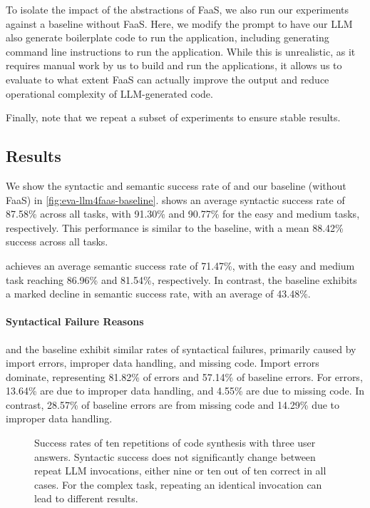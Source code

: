 To isolate the impact of the abstractions of FaaS, we also run our experiments against a baseline without FaaS.
Here, we modify the prompt to have our LLM also generate boilerplate code to run the application, including generating command line instructions to run the application.
While this is unrealistic, as it requires manual work by us to build and run the applications, it allows us to evaluate to what extent FaaS can actually improve the output and reduce operational complexity of LLM-generated code.

Finally, note that we repeat a subset of experiments to ensure stable results.


\subsection{Results}
\label{sec:eva:results}


We show the syntactic and semantic success rate of \sysname{} and our baseline (without FaaS) in \cref{fig:eva-llm4faas-baseline}.
\sysname{} shows an average syntactic success rate of 87.58\% across all tasks, with 91.30\% and 90.77\% for the easy and medium tasks, respectively.
This performance is similar to the baseline, with a mean 88.42\% success across all tasks.

\sysname{} achieves an average semantic success rate of 71.47\%, with the easy and medium task reaching 86.96\% and 81.54\%, respectively.
In contrast, the baseline exhibits a marked decline in semantic success rate, with an average of 43.48\%.

\paragraph{Syntactical Failure Reasons}
\label{sec:eva:result:syntactic-error}
\sysname{} and the baseline exhibit similar rates of syntactical failures, primarily caused by import errors, improper data handling, and missing code. 
Import errors dominate, representing 81.82\% of \sysname{} errors and 57.14\% of baseline errors. 
For \sysname{} errors, 13.64\% are due to improper data handling, and 4.55\% are due to missing code.
In contrast, 28.57\% of baseline errors are from missing code and 14.29\% due to improper data handling.


\begin{figure*}
    \centering
    \hfill
    
    \caption{
        Success rates of ten repetitions of \sysname{} code synthesis with three user answers.
        Syntactic success does not significantly change between repeat LLM invocations, either nine or ten out of ten correct in all cases.
        For the complex task, repeating an identical invocation can lead to different results.
    }
    \label{fig:eva:repeat}
\end{figure*}

